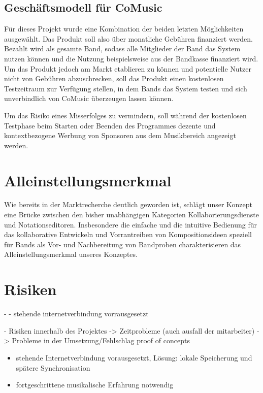 \documentclass[12pt]{scrartcl}
\begin{document}
\subsection{Geschäftsmodell für CoMusic}

Für dieses Projekt wurde eine Kombination der beiden letzten Möglichkeiten ausgewählt. Das Produkt soll also über monatliche Gebühren finanziert werden. Bezahlt wird als gesamte Band, sodass alle Mitglieder der Band das System nutzen können und die Nutzung beispielsweise aus der Bandkasse finanziert wird. Um das Produkt jedoch am Markt etablieren zu können und potentielle Nutzer nicht von Gebühren abzuschrecken, soll das Produkt einen kostenlosen Testzeitraum zur Verfügung stellen, in dem Bands das System testen und sich unverbindlich von CoMusic überzeugen lassen können.

Um das Risiko eines Misserfolges zu vermindern, soll während der kostenlosen Testphase beim Starten oder Beenden des Programmes dezente und kontextbezogene Werbung von Sponsoren aus dem Musikbereich angezeigt werden.



\section{Alleinstellungsmerkmal}

Wie bereits in der Marktrecherche deutlich geworden ist, schlägt unser Konzept eine Brücke zwischen den bisher unabhängigen Kategorien Kollaborierungsdienste und Notationseditoren. Insbesondere die einfache und die intuitive Bedienung für das kollaborative Entwickeln und Vorrantreiben von Kompositionsideen speziell für Bands als Vor- und Nachbereitung von Bandproben charakterisieren das Alleinstellungsmerkmal unseres Konzeptes.


\section{Risiken}


- 
- stehende internetverbindung vorrausgesetzt

- Risiken innerhalb des Projektes
-> Zeitprobleme (auch ausfall der mitarbeiter)
-> Probleme in der Umsetzung/Fehlschlag proof of concepts
\begin{itemize}
\item stehende Internetverbindung vorausgesetzt, Lösung: lokale Speicherung und spätere Synchronisation
\item fortgeschrittene musikalische Erfahrung notwendig
\end{itemize}
\end{document}
